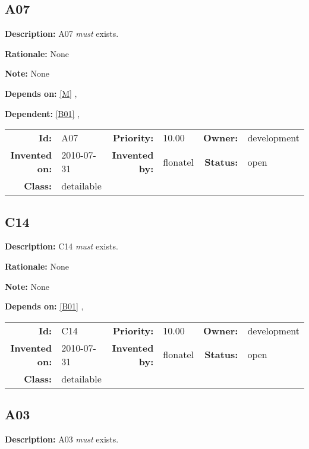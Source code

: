 \subsection{A07}\label{A07}
\textbf{Description:} A07 \textsl{must} exists.

\textbf{Rationale:} None

\textbf{Note:} None

\textbf{Depends on:} \ref{M} , 

\textbf{Dependent:} \ref{B01} , 

\par
{\small \begin{center}\begin{tabular}{rlrlrl}
\textbf{Id:} & A07 & \textbf{Priority:} & 10.00 & \textbf{Owner:} & development \\ 
\textbf{Invented on:} & 2010-07-31 & \textbf{Invented by:} & flonatel & \textbf{Status:} & open \\ 
\textbf{Class:} & detailable & & & & \\ 
\end{tabular}\end{center} }%
\subsection{C14}\label{C14}
\textbf{Description:} C14 \textsl{must} exists.

\textbf{Rationale:} None

\textbf{Note:} None

\textbf{Depends on:} \ref{B01} , 

\par
{\small \begin{center}\begin{tabular}{rlrlrl}
\textbf{Id:} & C14 & \textbf{Priority:} & 10.00 & \textbf{Owner:} & development \\ 
\textbf{Invented on:} & 2010-07-31 & \textbf{Invented by:} & flonatel & \textbf{Status:} & open \\ 
\textbf{Class:} & detailable & & & & \\ 
\end{tabular}\end{center} }%
\subsection{A03}\label{A03}
\textbf{Description:} A03 \textsl{must} exists.

